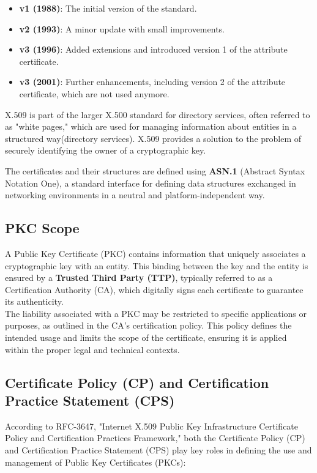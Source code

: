 \begin{itemize}
  \item \textbf{v1 (1988)}: The initial version of the standard.
  \item \textbf{v2 (1993)}: A minor update with small improvements.
  \item \textbf{v3 (1996)}: Added extensions and introduced version
    1 of the attribute certificate.
  \item \textbf{v3 (2001)}: Further enhancements, including version
    2 of the attribute certificate, which are not used anymore.
\end{itemize}

X.509 is part of the larger X.500 standard for directory services,
often referred to as "white pages," which are used for managing
information about entities in a structured way(directory services).
X.509 provides a solution to the problem of securely identifying the
owner of a cryptographic key.

The certificates and their structures are defined using \textbf{ASN.1}
(Abstract Syntax Notation One), a standard interface for defining data
structures exchanged in networking environments in a neutral and 
platform-independent way. 

\subsection{PKC Scope}
A Public Key Certificate (PKC) contains information that uniquely
associates a cryptographic key with an entity. This binding between
the key and the entity is ensured by a \textbf{Trusted Third Party
(TTP)}, typically referred to as a Certification Authority (CA), which
digitally signs each certificate to guarantee its authenticity.\\

The liability associated with a PKC may be restricted to specific
applications or purposes, as outlined in the CA's certification
policy. This policy defines the intended usage and limits the scope of
the certificate, ensuring it is applied within the proper legal and
technical contexts.

\subsection{Certificate Policy (CP) and Certification Practice
Statement (CPS)}

According to RFC-3647, "Internet X.509 Public Key Infrastructure
Certificate Policy and Certification Practices Framework," both the
Certificate Policy (CP) and Certification Practice Statement (CPS)
play key roles in defining the use and management of Public Key
Certificates (PKCs):

